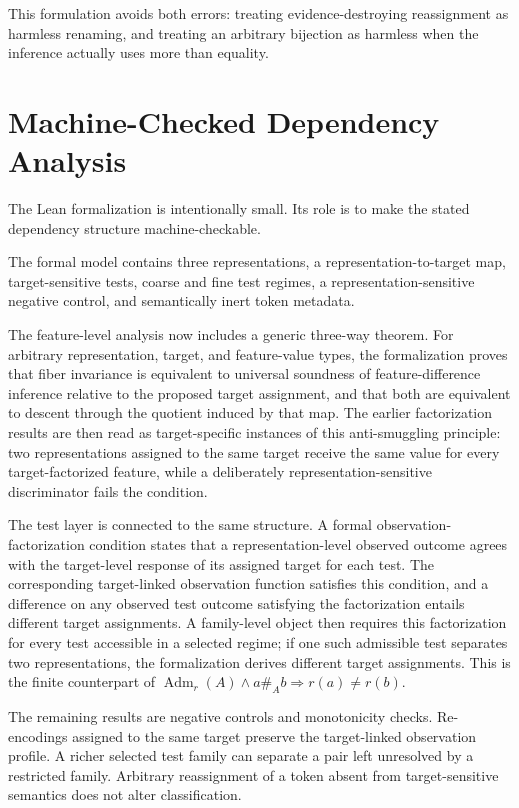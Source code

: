 \documentclass[12pt]{article}
\begin{document}
This formulation avoids both errors: treating evidence-destroying reassignment as harmless renaming, and treating an arbitrary bijection as harmless when the inference actually uses more than equality.

\section{Machine-Checked Dependency Analysis}

The Lean formalization is intentionally small. Its role is to make the stated dependency structure machine-checkable.

The formal model contains three representations, a representation-to-target map, target-sensitive tests, coarse and fine test regimes, a representation-sensitive negative control, and semantically inert token metadata.

The feature-level analysis now includes a generic three-way theorem. For arbitrary representation, target, and feature-value types, the formalization proves that fiber invariance is equivalent to universal soundness of feature-difference inference relative to the proposed target assignment, and that both are equivalent to descent through the quotient induced by that map. The earlier factorization results are then read as target-specific instances of this anti-smuggling principle: two representations assigned to the same target receive the same value for every target-factorized feature, while a deliberately representation-sensitive discriminator fails the condition.

The test layer is connected to the same structure. A formal observation-factorization condition states that a representation-level observed outcome agrees with the target-level response of its assigned target for each test. The corresponding target-linked observation function satisfies this condition, and a difference on any observed test outcome satisfying the factorization entails different target assignments. A family-level object then requires this factorization for every test accessible in a selected regime; if one such admissible test separates two representations, the formalization derives different target assignments. This is the finite counterpart of \(\operatorname{Adm}_r(A)\land a\mathrel{\#_A}b\Rightarrow r(a)\neq r(b)\).

The remaining results are negative controls and monotonicity checks. Re-encodings assigned to the same target preserve the target-linked observation profile. A richer selected test family can separate a pair left unresolved by a restricted family. Arbitrary reassignment of a token absent from target-sensitive semantics does not alter classification.
\end{document}
